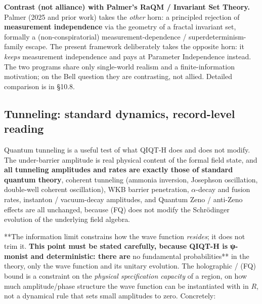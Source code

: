 \documentclass[11pt,a4paper]{article}
\begin{document}
\textbf{Contrast (not alliance) with Palmer's RaQM / Invariant Set Theory.} Palmer (2025 and prior work) takes the \emph{other} horn: a principled rejection of \textbf{measurement independence} via the geometry of a fractal invariant set, formally a (non-conspiratorial) measurement-dependence / superdeterminism-family escape. The present framework deliberately takes the opposite horn: it \emph{keeps} measurement independence and pays at Parameter Independence instead. The two programs share only single-world realism and a finite-information motivation; on the Bell question they are contrasting, not allied. Detailed comparison is in §10.8.

\subsection{Tunneling: standard dynamics, record-level reading}

Quantum tunneling is a useful test of what QIQT-H does and does not modify. The under-barrier amplitude is real physical content of the formal field state, and \textbf{all tunneling amplitudes and rates are exactly those of standard quantum theory}, coherent tunneling (ammonia inversion, Josephson oscillation, double-well coherent oscillation), WKB barrier penetration, $\alpha$-decay and fusion rates, instanton / vacuum-decay amplitudes, and Quantum Zeno / anti-Zeno effects are all unchanged, because (FQ) does not modify the Schrödinger evolution of the underlying field algebra.

**The information limit constrains how the wave function \emph{resides}; it does not trim it.\textbf{ This point must be stated carefully, because QIQT-H is ψ-monist and deterministic: there are }no fundamental probabilities** in the theory, only the wave function and its unitary evolution. The holographic / (FQ) bound is a constraint on the \emph{physical specification capacity} of a region, on how much amplitude/phase structure the wave function can be instantiated with in $R$, not a dynamical rule that sets small amplitudes to zero. Concretely:
\end{document}
